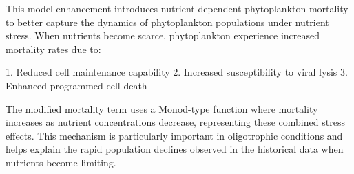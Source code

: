 This model enhancement introduces nutrient-dependent phytoplankton mortality to better capture the dynamics of phytoplankton populations under nutrient stress. When nutrients become scarce, phytoplankton experience increased mortality rates due to:

1. Reduced cell maintenance capability
2. Increased susceptibility to viral lysis
3. Enhanced programmed cell death

The modified mortality term uses a Monod-type function where mortality increases as nutrient concentrations decrease, representing these combined stress effects. This mechanism is particularly important in oligotrophic conditions and helps explain the rapid population declines observed in the historical data when nutrients become limiting.
